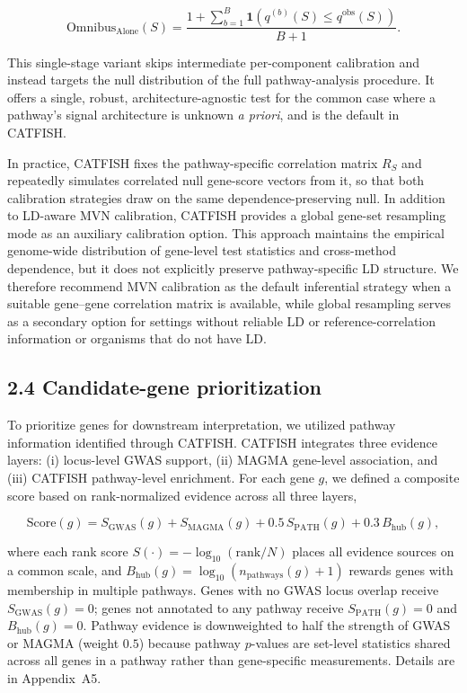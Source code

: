\documentclass[unnumsec,webpdf,contemporary,large]{oup-authoring-template}%
\theoremstyle{thmstyleone}%
\theoremstyle{thmstyletwo}%
\theoremstyle{thmstylethree}%
\begin{document}
\[
\mathrm{Omnibus}_{\mathrm{Alone}}(S)
=
\frac{
1+\sum_{b=1}^{B}\mathbf{1}\!\left(
q^{(b)}(S)\le q^{\mathrm{obs}}(S)
\right)
}{
B+1
}.
\]


This single-stage variant skips intermediate per-component calibration and instead targets the null distribution of the full pathway-analysis procedure. It offers a single, robust, architecture-agnostic test for the common case where a pathway’s signal architecture is unknown \emph{a priori}, and is the default in CATFISH.

\medskip
In practice, CATFISH fixes the pathway-specific correlation matrix $R_S$ and repeatedly simulates correlated null gene-score vectors from it, so that both calibration strategies draw on the same dependence-preserving null. In addition to LD-aware MVN calibration, CATFISH provides a global gene-set resampling mode as an auxiliary calibration option. This approach maintains the empirical genome-wide distribution of gene-level test statistics and cross-method dependence, but it does not explicitly preserve pathway-specific LD structure. We therefore recommend MVN calibration as the default inferential strategy when a suitable gene--gene correlation matrix is available, while global resampling serves as a secondary option for settings without reliable LD or reference-correlation information or organisms that do not have LD.


\subsection*{2.4 Candidate-gene prioritization}
To prioritize genes for downstream interpretation, we utilized pathway information identified through CATFISH. CATFISH integrates three evidence layers: (i) locus-level GWAS support, (ii) MAGMA gene-level association, and (iii) CATFISH pathway-level enrichment. For each gene $g$, we defined a composite score based on rank-normalized evidence across all three layers,

\[
\mathrm{Score}(g)
= S_{\mathrm{GWAS}}(g)
+ S_{\mathrm{MAGMA}}(g)
+ 0.5\,S_{\mathrm{PATH}}(g)
+ 0.3\,B_{\mathrm{hub}}(g),
\]

where each rank score $S(\cdot) = -\log_{10}(\mathrm{rank}/N)$ places all evidence sources on a common scale, and $B_{\mathrm{hub}}(g) = \log_{10}(n_{\mathrm{pathways}}(g)+1)$ rewards genes with membership in multiple pathways. Genes with no GWAS locus overlap receive $S_{\mathrm{GWAS}}(g)=0$; genes not annotated to any pathway receive $S_{\mathrm{PATH}}(g)=0$ and $B_{\mathrm{hub}}(g)=0$. Pathway evidence is downweighted to half the strength of GWAS or MAGMA (weight $0.5$) because pathway $p$-values are set-level statistics shared across all genes in a pathway rather than gene-specific measurements. Details are in Appendix~A5.
\end{document}
